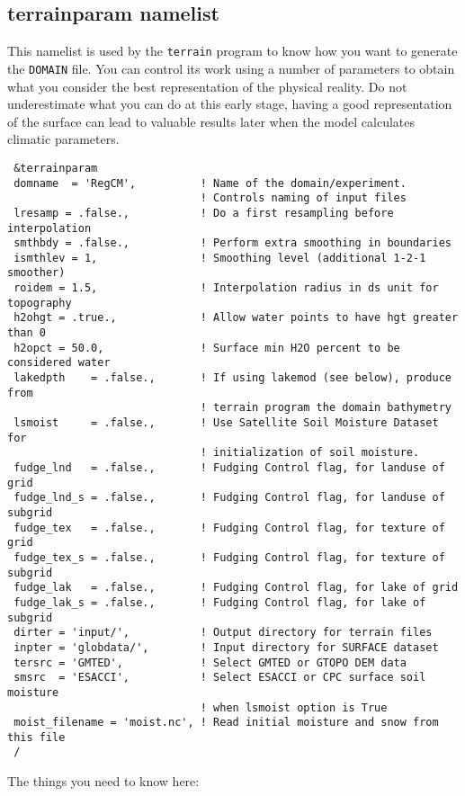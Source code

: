 \subsection{terrainparam namelist}
\label{terparam}
This namelist is used by the \verb=terrain= program to know how you want
to generate the \verb=DOMAIN= file. You can control its work using a number of
parameters to obtain what you consider the best representation of the
physical reality. Do not underestimate what you can do at this early stage,
having a good representation of the surface can lead to valuable results
later when the model calculates climatic parameters.

{\footnotesize
\begin{Verbatim}
 &terrainparam
 domname  = 'RegCM',          ! Name of the domain/experiment.
                              ! Controls naming of input files
 lresamp = .false.,           ! Do a first resampling before interpolation
 smthbdy = .false.,           ! Perform extra smoothing in boundaries
 ismthlev = 1,                ! Smoothing level (additional 1-2-1 smoother)
 roidem = 1.5,                ! Interpolation radius in ds unit for topography
 h2ohgt = .true.,             ! Allow water points to have hgt greater than 0
 h2opct = 50.0,               ! Surface min H2O percent to be considered water
 lakedpth    = .false.,       ! If using lakemod (see below), produce from
                              ! terrain program the domain bathymetry
 lsmoist     = .false.,       ! Use Satellite Soil Moisture Dataset for
                              ! initialization of soil moisture.
 fudge_lnd   = .false.,       ! Fudging Control flag, for landuse of grid 
 fudge_lnd_s = .false.,       ! Fudging Control flag, for landuse of subgrid
 fudge_tex   = .false.,       ! Fudging Control flag, for texture of grid
 fudge_tex_s = .false.,       ! Fudging Control flag, for texture of subgrid
 fudge_lak   = .false.,       ! Fudging Control flag, for lake of grid
 fudge_lak_s = .false.,       ! Fudging Control flag, for lake of subgrid
 dirter = 'input/',           ! Output directory for terrain files
 inpter = 'globdata/',        ! Input directory for SURFACE dataset
 tersrc = 'GMTED',            ! Select GMTED or GTOPO DEM data
 smsrc  = 'ESACCI',           ! Select ESACCI or CPC surface soil moisture
                              ! when lsmoist option is True
 moist_filename = 'moist.nc', ! Read initial moisture and snow from this file
 /
\end{Verbatim}
}

The things you need to know here:

